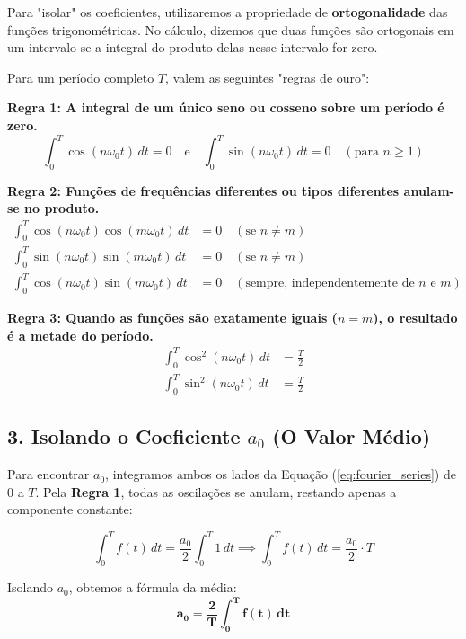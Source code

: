 Para "isolar" os coeficientes, utilizaremos a propriedade de \textbf{ortogonalidade} das funções trigonométricas. No cálculo, dizemos que duas funções são ortogonais em um intervalo se a integral do produto delas nesse intervalo for zero. 

Para um período completo $T$, valem as seguintes "regras de ouro":

\textbf{Regra 1: A integral de um único seno ou cosseno sobre um período é zero.}
\begin{equation}
\int_0^T \cos(n\omega_0 t) \, dt = 0 \quad \text{e} \quad \int_0^T \sin(n\omega_0 t) \, dt = 0 \quad (\text{para } n \geq 1)
\end{equation}

\textbf{Regra 2: Funções de frequências diferentes ou tipos diferentes anulam-se no produto.}
\begin{align}
\int_0^T \cos(n\omega_0 t) \cos(m\omega_0 t) \, dt &= 0 \quad (\text{se } n \neq m) \\
\int_0^T \sin(n\omega_0 t) \sin(m\omega_0 t) \, dt &= 0 \quad (\text{se } n \neq m) \\
\int_0^T \cos(n\omega_0 t) \sin(m\omega_0 t) \, dt &= 0 \quad (\text{sempre, independentemente de } n \text{ e } m)
\end{align}

\textbf{Regra 3: Quando as funções são exatamente iguais ($n = m$), o resultado é a metade do período.}
\begin{align}
\int_0^T \cos^2(n\omega_0 t) \, dt &= \frac{T}{2} \\
\int_0^T \sin^2(n\omega_0 t) \, dt &= \frac{T}{2}
\end{align}

\subsection*{3. Isolando o Coeficiente $a_0$ (O Valor Médio)}

Para encontrar $a_0$, integramos ambos os lados da Equação (\ref{eq:fourier_series}) de $0$ a $T$. Pela \textbf{Regra 1}, todas as oscilações se anulam, restando apenas a componente constante:

\begin{equation}
\int_0^T f(t) \, dt = \frac{a_0}{2} \int_0^T 1 \, dt \implies \int_0^T f(t) \, dt = \frac{a_0}{2} \cdot T
\end{equation}

Isolando $a_0$, obtemos a fórmula da média:
\begin{equation}
\mathbf{a_0 = \frac{2}{T} \int_0^T f(t) \, dt}
\end{equation}

